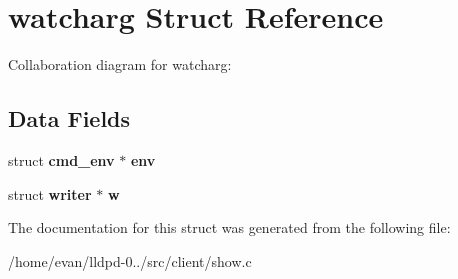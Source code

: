 \section{watcharg \-Struct \-Reference}
\label{structwatcharg}


\-Collaboration diagram for watcharg\-:
\subsection*{\-Data \-Fields}
\begin{DoxyCompactItemize}
\item 
struct {\bf cmd\-\_\-env} $\ast$ {\bfseries env}\label{structwatcharg_ac3aeb07e71c70e3bc5499709743004e1}

\item 
struct {\bf writer} $\ast$ {\bfseries w}\label{structwatcharg_a047cf8b56dc18f017b29bc08f6f68d89}

\end{DoxyCompactItemize}


\-The documentation for this struct was generated from the following file\-:\begin{DoxyCompactItemize}
\item 
/home/evan/lldpd-\/0../src/client/show.\-c\end{DoxyCompactItemize}
